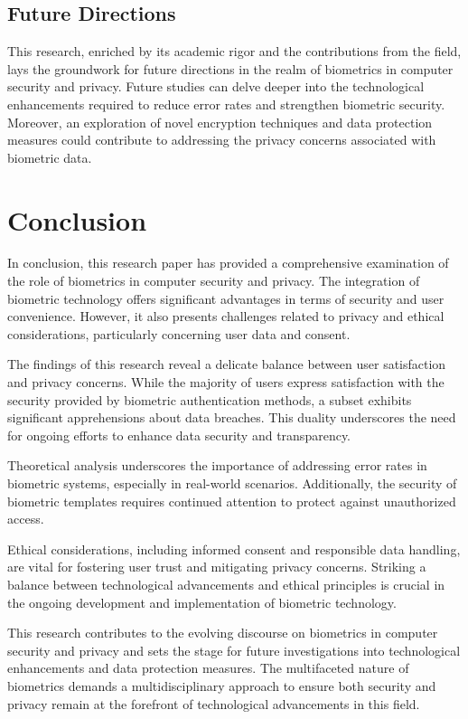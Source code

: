 \documentclass{IEEEtran}
\begin{document}
\subsection{Future Directions}
This research, enriched by its academic rigor and the contributions from the field, lays the groundwork for future directions in the realm of biometrics in computer security and privacy. Future studies can delve deeper into the technological enhancements required to reduce error rates and strengthen biometric security. Moreover, an exploration of novel encryption techniques and data protection measures could contribute to addressing the privacy concerns associated with biometric data.

\section{Conclusion}
In conclusion, this research paper has provided a comprehensive examination of the role of biometrics in computer security and privacy. The integration of biometric technology offers significant advantages in terms of security and user convenience. However, it also presents challenges related to privacy and ethical considerations, particularly concerning user data and consent.

The findings of this research reveal a delicate balance between user satisfaction and privacy concerns. While the majority of users express satisfaction with the security provided by biometric authentication methods, a subset exhibits significant apprehensions about data breaches. This duality underscores the need for ongoing efforts to enhance data security and transparency.

Theoretical analysis underscores the importance of addressing error rates in biometric systems, especially in real-world scenarios. Additionally, the security of biometric templates requires continued attention to protect against unauthorized access.

Ethical considerations, including informed consent and responsible data handling, are vital for fostering user trust and mitigating privacy concerns. Striking a balance between technological advancements and ethical principles is crucial in the ongoing development and implementation of biometric technology.

This research contributes to the evolving discourse on biometrics in computer security and privacy and sets the stage for future investigations into technological enhancements and data protection measures. The multifaceted nature of biometrics demands a multidisciplinary approach to ensure both security and privacy remain at the forefront of technological advancements in this field.
\end{document}
